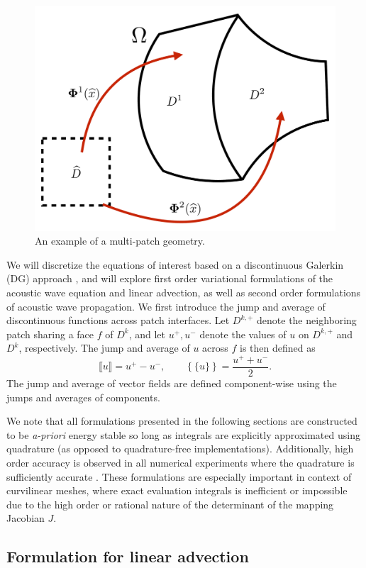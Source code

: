 \documentclass[preprint,10pt]{elsarticle}
\newcommand{\LRc}[1]{\left\{ #1 \right\}}
\newcommand{\jump}[1] {\ensuremath{\llbracket#1\rrbracket}}
\newcommand{\avg}[1] {\ensuremath{\LRc{\!\{#1\}\!}}}
\newcommand{\reviewerTwo}[1]{#1}
\begin{document}
\begin{figure}
\centering
\includegraphics[width=.4\textwidth]{multipatch_diagram.pdf}
\caption{An example of a multi-patch geometry.}
\label{fig:multipatch_diagram}
\end{figure}

We will discretize the equations of interest based on a discontinuous Galerkin (DG) approach \cite{hesthaven2007nodal,langer2015multipatch}, and will explore first order variational formulations of the acoustic wave equation and linear advection, as well as second order formulations of acoustic wave propagation.  We first introduce the jump and average of discontinuous functions across {\color{forestgreen} patch} interfaces.  Let $D^{k,+}$ denote the neighboring {\color{forestgreen}  patch} \reviewerTwo{sharing} a face $f$ of $D^k$, and let $u^+,u^-$ denote the values of $u$ on $D^{k,+}$ and $D^k$, respectively.  The jump \reviewerTwo{and average} of $u$ across $f$ is then defined as
\[
\jump{u} = u^+ - u^-, \qquad \avg{u} = \frac{u^+ + u^-}{2}.
\]
The jump and average of vector fields are defined component-wise using the jumps and averages of components.  

We note that all formulations presented in the following sections are constructed to be \textit{a-priori} energy stable so long as integrals are explicitly approximated using quadrature (as opposed to quadrature-free implementations).  Additionally, high order accuracy is observed in all numerical experiments where the quadrature is sufficiently accurate \cite{chan2016weight2}.  These formulations are especially important in context of curvilinear meshes, where exact evaluation integrals is inefficient or impossible due to the high order or rational nature of the determinant of the mapping Jacobian $J$.  


\subsection{Formulation for linear advection}
\end{document}
